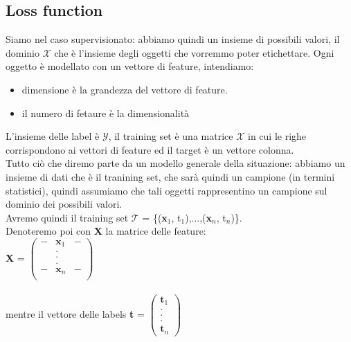 \documentclass[12pt, oneside]{extbook}
\begin{document}
\subsection{Loss function}
Siamo nel caso supervisionato: abbiamo quindi un insieme di possibili valori, il dominio $\mathscr{X}$ che è l'insieme degli oggetti che vorremmo poter etichettare. Ogni oggetto è modellato con un vettore di feature, intendiamo:
\begin{itemize}
	\item dimensione è la grandezza del vettore di feature.
	\item il numero di fetaure è la dimensionalità
\end{itemize}
L'insieme delle label è $\mathscr{Y}$, il training set è una matrice $\mathscr{X}$ in cui le righe corrispondono ai vettori di feature ed il target è un vettore colonna.\\Tutto ciò che diremo parte da un modello generale della situazione: abbiamo un insieme di dati che è il tranining set, che sarà quindi un campione (in termini statistici), quindi assumiamo che tali oggetti rappresentino un campione sul dominio dei possibili valori.\\Avremo quindi il training set 
$\mathscr{T}$ = \{(\textbf{x$_1$}, t$_1$),...,(\textbf{x$_n$}, t$_n$)\}.\\Denoteremo poi con \textbf{X} la matrice delle feature:\\
\textbf{X} = $\begin{pmatrix}
	- & \textbf{x$_1$} & -\\
	 & . & \\
	 & . & \\
	 & . & \\
	 - & \textbf{x$_n$} & -\\
\end{pmatrix}$\\\\mentre il vettore delle labels \textbf{t} = $\begin{pmatrix}
\textbf{t$_1$}\\
.\\
.\\
.\\
\textbf{t$_n$}
\end{pmatrix}$\\
\end{document}
